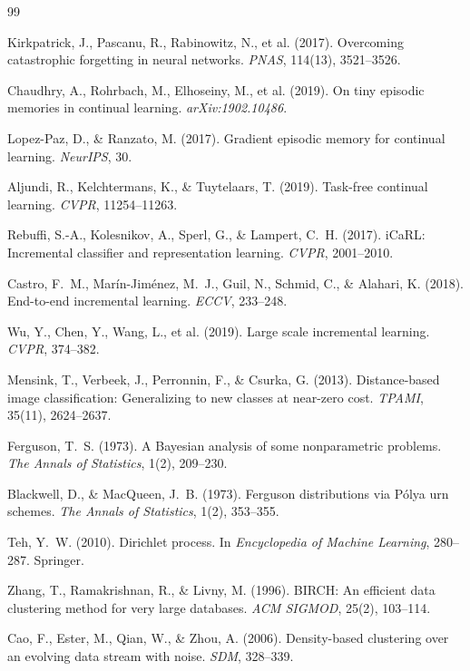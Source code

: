 \documentclass[11pt,a4paper]{article}
\begin{document}
\begin{thebibliography}{99}

 Kirkpatrick, J., Pascanu, R., Rabinowitz, N., et al. (2017). Overcoming catastrophic forgetting in neural networks. \textit{PNAS}, 114(13), 3521–3526.

 Chaudhry, A., Rohrbach, M., Elhoseiny, M., et al. (2019). On tiny episodic memories in continual learning. \textit{arXiv:1902.10486}.

 Lopez-Paz, D., \& Ranzato, M. (2017). Gradient episodic memory for continual learning. \textit{NeurIPS}, 30.

 Aljundi, R., Kelchtermans, K., \& Tuytelaars, T. (2019). Task-free continual learning. \textit{CVPR}, 11254–11263.

 Rebuffi, S.-A., Kolesnikov, A., Sperl, G., \& Lampert, C.~H. (2017). iCaRL: Incremental classifier and representation learning. \textit{CVPR}, 2001–2010.

 Castro, F.~M., Marín-Jiménez, M.~J., Guil, N., Schmid, C., \& Alahari, K. (2018). End-to-end incremental learning. \textit{ECCV}, 233–248.

 Wu, Y., Chen, Y., Wang, L., et al. (2019). Large scale incremental learning. \textit{CVPR}, 374–382.

 Mensink, T., Verbeek, J., Perronnin, F., \& Csurka, G. (2013). Distance-based image classification: Generalizing to new classes at near-zero cost. \textit{TPAMI}, 35(11), 2624–2637.

 Ferguson, T.~S. (1973). A Bayesian analysis of some nonparametric problems. \textit{The Annals of Statistics}, 1(2), 209–230.

 Blackwell, D., \& MacQueen, J.~B. (1973). Ferguson distributions via Pólya urn schemes. \textit{The Annals of Statistics}, 1(2), 353–355.

 Teh, Y.~W. (2010). Dirichlet process. In \textit{Encyclopedia of Machine Learning}, 280–287. Springer.

 Zhang, T., Ramakrishnan, R., \& Livny, M. (1996). BIRCH: An efficient data clustering method for very large databases. \textit{ACM SIGMOD}, 25(2), 103–114.

 Cao, F., Ester, M., Qian, W., \& Zhou, A. (2006). Density-based clustering over an evolving data stream with noise. \textit{SDM}, 328–339.


\end{thebibliography}
\end{document}

